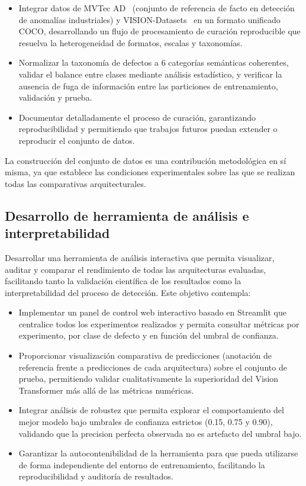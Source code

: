 \begin{itemize}
    \item Integrar datos de MVTec AD~\cite{bergmann2019mvtec} (conjunto de referencia de facto en detección de anomalías industriales) y VISION-Datasets~\cite{bai2023visiondatasets} en un formato unificado COCO, desarrollando un flujo de procesamiento de curación reproducible que resuelva la heterogeneidad de formatos, escalas y taxonomías.

    \item Normalizar la taxonomía de defectos a 6 categorías semánticas coherentes, validar el balance entre clases mediante análisis estadístico, y verificar la ausencia de fuga de información entre las particiones de entrenamiento, validación y prueba.
    
    \item Documentar detalladamente el proceso de curación, garantizando reproducibilidad y permitiendo que trabajos futuros puedan extender o reproducir el conjunto de datos.
\end{itemize}

La construcción del conjunto de datos es una contribución metodológica en sí misma, ya que establece las condiciones experimentales sobre las que se realizan todas las comparativas arquitecturales.

\subsection{Desarrollo de herramienta de análisis e interpretabilidad}

Desarrollar una herramienta de análisis interactiva que permita visualizar, auditar y comparar el rendimiento de todas las arquitecturas evaluadas, facilitando tanto la validación científica de los resultados como la interpretabilidad del proceso de detección. Este objetivo contempla:

\begin{itemize}
    \item Implementar un panel de control web interactivo basado en Streamlit que centralice todos los experimentos realizados y permita consultar métricas por experimento, por clase de defecto y en función del umbral de confianza.

    \item Proporcionar visualización comparativa de predicciones (anotación de referencia frente a predicciones de cada arquitectura) sobre el conjunto de prueba, permitiendo validar cualitativamente la superioridad del Vision Transformer más allá de las métricas numéricas.
    
    \item Integrar análisis de robustez que permita explorar el comportamiento del mejor modelo bajo umbrales de confianza estrictos (0.15, 0.75 y 0.90), validando que la precision perfecta observada no es artefacto del umbral bajo.
    
    \item Garantizar la autocontenibilidad de la herramienta para que pueda utilizarse de forma independiente del entorno de entrenamiento, facilitando la reproducibilidad y auditoría de resultados.
\end{itemize}

